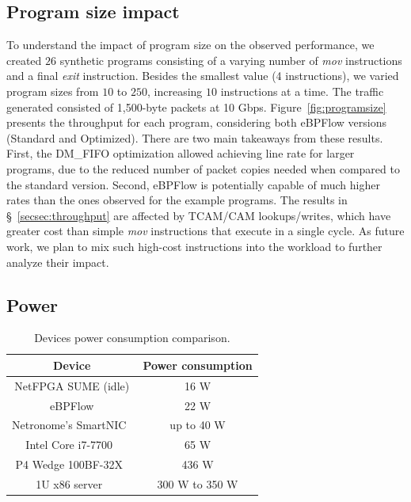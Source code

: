 \subsection{Program size impact}

To understand the impact of program size on the observed performance, we created $26$ synthetic programs consisting of a varying number of \textit{mov} instructions and a final \textit{exit} instruction. Besides the smallest value (4 instructions), we varied program sizes from $10$ to $250$, increasing $10$ instructions at a time. The traffic generated consisted of 1,500-byte packets at 10 Gbps. Figure~\ref{fig:programsize} presents the throughput for each program, considering both eBPFlow versions (Standard and Optimized). There are two main takeaways from these results. First, the DM\_FIFO optimization allowed achieving line rate for larger programs, due to the reduced number of packet copies needed when compared to the standard version. Second, eBPFlow is potentially capable of much higher rates than the ones observed for the example programs. The results in \S~\ref{secsec:throughput} are affected by TCAM/CAM lookups/writes, which have greater cost than simple \textit{mov} instructions that execute in a single cycle. As future work, we plan to mix such high-cost instructions into the workload to further analyze their impact.




\subsection{Power}
\label{sec:power}

\begin{table}[t] %
\centering
\caption{Devices power consumption comparison.}
\label{tab:powerconsumption}
\begin{tabular}{|c|c|}
\hline \textbf{Device} & \textbf{Power consumption} \\ \hline
NetFPGA SUME (idle)  & 16 W \\ \hline
eBPFlow  & 22 W \\ \hline
Netronome's SmartNIC~\cite{NetronomePC} & up to 40 W \\ \hline
Intel Core i7-7700~\cite{i7i7700} & 65 W \\ \hline
P4 Wedge 100BF-32X~\cite{P4wedge} & 436 W \\ \hline
1U x86 server~\cite{x86serverIBM} & 300 W to 350 W \\ \hline
\end{tabular}
\end{table}



